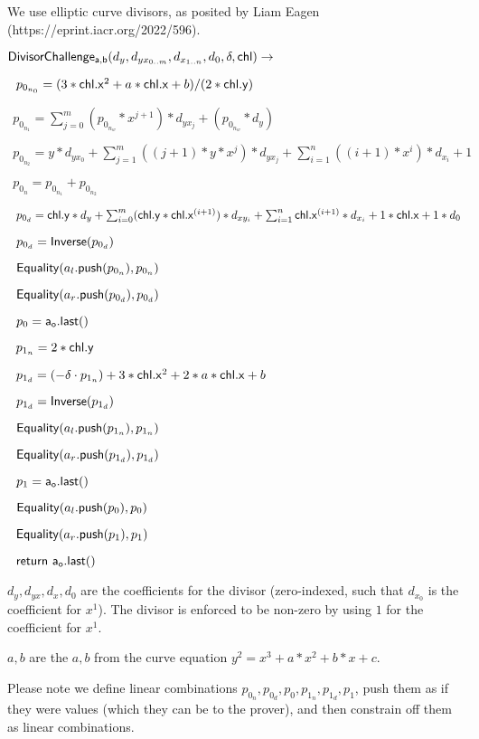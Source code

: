 \documentclass[]{article}
\begin{document}
We use elliptic curve divisors, as posited by Liam Eagen (https://eprint.iacr.org/2022/596).

\newcommand{\dloglhs}{\mathsf{DivisorChallenge_{a,b}}}

$\dloglhs(d_y, d_{yx_{0..m}}, d_{x_{1..n}}, d_0, \delta, \chl) \rightarrow$

$~~p_{0_{n_0}} = (3 * \mathsf{chl}\mathsf{.x}^2 + a * \mathsf{chl}\mathsf{.x} + b) / (2 * \mathsf{chl}\mathsf{.y})$

$~~p_{0_{n_1}} = \sum^m_{j=0} (p_{0_{n_w}} * x^{j+1}) * d_{yx_j} + (p_{0_{n_w}} * d_y)$

$~~p_{0_{n_2}} = y * d_{yx_0} + \sum^m_{j=1} ((j+1) * y * x^j) * d_{yx_j} + \sum^n_{i=1} ((i+1) * x^i) * d_{x_i} + 1$

$~~p_{0_n} = p_{0_{n_1}} + p_{0_{n_2}}$

$~~p_{0_d} = \mathsf{chl}\mathsf{.y} * d_y + \sum^m_{i=0} (\mathsf{chl}\mathsf{.y} * \mathsf{chl}\mathsf{.x}^{(i+1)}) * d_{xy_{i}} + \sum^n_{i=1} \mathsf{chl}\mathsf{.x}^{(i+1)} * d_{x_{i}} + 1 * \mathsf{chl}\mathsf{.x} + 1 * d_0$

$~~p_{0_d} = \mathsf{Inverse}(p_{0_d})$

$~~\mathsf{Equality}(a_l\mathsf{.push}(p_{0_n}), p_{0_n})$

$~~\mathsf{Equality}(a_r\mathsf{.push}(p_{0_d}), p_{0_d})$

$~~p_0 = \mathsf{a_o.last()}$

$~~p_{1_n} = 2 * \mathsf{chl}\mathsf{.y}$

$~~p_{1_d} = (-\delta \cdot p_{1_n}) + 3 * \mathsf{chl}\mathsf{.x}^2 + 2 * a * \mathsf{chl}\mathsf{.x} + b$

$~~p_{1_d} = \mathsf{Inverse}(p_{1_d})$

$~~\mathsf{Equality}(a_l\mathsf{.push}(p_{1_n}), p_{1_n})$

$~~\mathsf{Equality}(a_r\mathsf{.push}(p_{1_d}), p_{1_d})$

$~~p_1 = \mathsf{a_o.last()}$

$~~\mathsf{Equality}(a_l\mathsf{.push}(p_0), p_0)$

$~~\mathsf{Equality}(a_r\mathsf{.push}(p_1), p_1)$

$~~\mathsf{return} ~\mathsf{a_o.last()}$

$d_y, d_{yx}, d_x, d_0$ are the coefficients for the divisor (zero-indexed, such that $d_{x_0}$ is the coefficient for $x^1$). The divisor is enforced to be non-zero by using $1$ for the coefficient for $x^1$.

$a, b$ are the $a, b$ from the curve equation $y^2 = x^3 + a * x^2 + b * x + c$.

Please note we define linear combinations $p_{0_n}, p_{0_d}, p_0, p_{1_n}, p_{1_d}, p_1$, push them as if they were values (which they can be to the prover), and then constrain off them as linear combinations.
\end{document}
